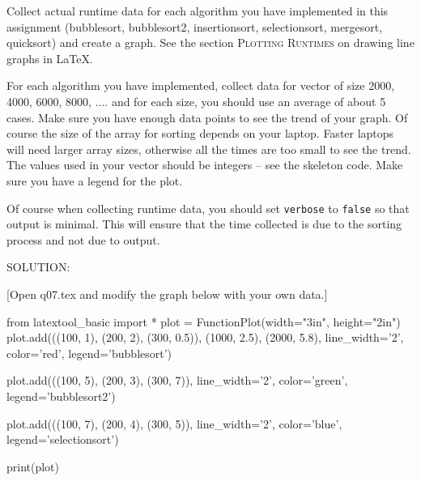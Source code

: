 Collect actual runtime data for each algorithm you have implemented in this
assignment
(bubblesort, bubblesort2, insertionsort, selectionsort,
mergesort, quicksort)
and create a graph.
See the section \textsc{Plotting Runtimes}
on drawing line graphs in \LaTeX.

For each algorithm you have implemented, collect data for 
vector of size 2000, 4000, 6000, 8000, ....
and for each size, you should use an average of about 5 cases.
Make sure you have enough data points to see the trend of your graph.
Of course the size of the array for sorting depends on your laptop.
Faster laptops will need larger array sizes, otherwise all the times
are too small to see the trend.
The values used in your vector should be integers --
see the skeleton code.
Make sure you have a legend for the plot.

Of course when collecting runtime data, you should set
\verb!verbose! to \verb!false! so that output is minimal.
This will ensure that the time collected is due to the sorting process
and not due to output.

SOLUTION:

[Open q07.tex and modify the graph below with your own data.]
\begin{python}
from latextool_basic import *
plot = FunctionPlot(width="3in", height="2in")
plot.add(((100, 1),
          (200, 2),
          (300, 0.5)),
          (1000, 2.5),
          (2000, 5.8),
          line_width='2', color='red', legend='bubblesort')

plot.add(((100, 5),
          (200, 3),
          (300, 7)),
          line_width='2', color='green', legend='bubblesort2')

plot.add(((100, 7),
          (200, 4),
          (300, 5)),
          line_width='2', color='blue', legend='selectionsort')
          
print(plot)
\end{python}

